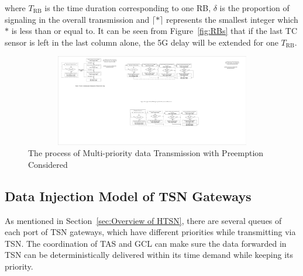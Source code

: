 \documentclass{SCIS2021}
\begin{document}
	\noindent where $T_\text{RB}$ is the time duration corresponding to one RB, $\delta$ is the proportion of signaling in the overall transmission and $\lceil*\rceil$ represents the smallest integer which $*$ is less than or equal to.
	It can be seen from Figure~\ref{fig:RBs} that if the last TC sensor is left in the last column alone, the 5G delay will be extended for one $T_\text{RB}$.
	
	
	\begin{figure}[h] 
		\centering 
		\includegraphics[height=4cm, width=16.2cm]{wireless_trans_mech} 
		\caption{The process of Multi-priority data Transmission with Preemption Considered} 
		\label{fig:process}
	\end{figure}
	
	
	
	

	
	
	\subsection{Data Injection Model of TSN Gateways}  
	As mentioned in Section~\ref{sec:Overview of HTSN}, there are several queues of each port of TSN gateways, which have different priorities while transmitting via TSN. The coordination of TAS and GCL can make sure the data forwarded in TSN can be deterministically delivered within its time demand while keeping its priority.
	
\end{document}
